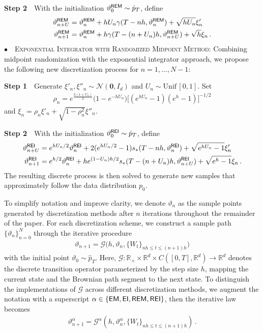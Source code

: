\documentclass[11pt]{article}
\def\R{\mathbb R}
\begin{document}
\vspace{0.2cm}
\textbf{Step 2}~~With the initialization $\vartheta^{\sf REM}_{0}\sim\hat p_T$, define
\begin{align*}
\vartheta^{\sf REM}_{n+U}&=
\vartheta^{\sf REM}_{n}
+hU_n\gamma(T-nh,\vartheta^{\sf REM}_{n})
 +{\sqrt{hU_n}\xi'_n}\\
\vartheta^{\sf REM}_{n+1}&=\vartheta^{\sf REM}_{n}
+h\gamma(T-(n+U_n)h, \vartheta^{\sf REM}_{n+U})
 +{\sqrt{h}\xi_n}\,.
\end{align*}
\noindent $\bullet$~~\textsc{Exponential Integrator with Randomized Midpoint Method:} \quad Combining midpoint randomization with the exponential integrator approach, we propose the following new discretization process
for $n=1,\dots,N-1$:

\vspace{0.2cm}
\textbf{Step 1}~~Generate $\xi'_n,\xi''_n\sim \mathcal{N}(\mathbf{0},I_d)$ and $U_n\sim\text{Unif}\,[0,1]$. 
Set 
\begin{align*}
 \rho_n= e^{\frac{h(1+U_n)}{2}}\big(1-e^{-hU_n}\big)\Big[{(e^{hU_n}-1)(e^h-1)}  \Big]^{-1/2}
\end{align*} 
and $\xi_n=\rho_n\xi'_n+\sqrt{1-\rho_n^2}\xi''_n$.

\vspace{0.2cm}
\textbf{Step 2}~~With the initialization $\vartheta^{\sf REI}_{0}\sim\hat p_T$, define
\begin{align*}
\vartheta^{\sf REI}_{n+U}&=e^{hU_n/2}\vartheta^{\sf REI}_{n}
+2(e^{hU_n/2}-1)s_*(T-nh,\vartheta^{\sf REI}_{n}) +\sqrt{e^{hU_n}-1}\xi'_n\\
\vartheta^{\sf REI}_{n+1}&=e^{h/2}\vartheta^{\sf REI}_{n}
+he^{(1-U_n)h/2}s_*(T-(n+U_n)h,\vartheta^{\sf REI}_{n+U}) +\sqrt{e^h-1}\xi_n\,.
\end{align*}
The resulting discrete process is then solved to generate new samples that approximately follow the data distribution $p_0$.

To simplify notation and improve clarity,
we denote $\vartheta_n$ as the sample points generated by discretization methods after $n$ iterations throughout the remainder of the paper.
For each discretization scheme, we construct a sample path $\{\vartheta_n\}_{n=0}^N$ through the iterative procedure
\begin{align*}
\vartheta_{n+1}=\mathcal{G}\big(h,\vartheta_n,\{W_t\}_{nh\leqslant t\leqslant (n+1)h}\big)
\end{align*}
with the initial point $\vartheta_0\sim\hat{p}_T$.
Here, $\mathcal{G}:\R_+\times\R^d\times C([0,T],\R^d)\to\mathbb{R}^d$ denotes the discrete transition operator parameterized by the step size $h$, mapping the current state and the Brownian path segment to the next state.
To distinguish the implementations of $\mathcal{G}$ across different discretization methods, we augment the notation with a superscript $\alpha\in\{\sf EM,\sf EI,\sf REM,\sf REI\}$, then the iterative law becomes
\begin{align*}
    \vartheta_{n+1}^{\alpha}=\mathcal{G}^{\alpha}(h,\vartheta_n^{\alpha},\{W_t\}_{nh\leqslant t\leqslant (n+1)h})\,.
\end{align*}
\end{document}
